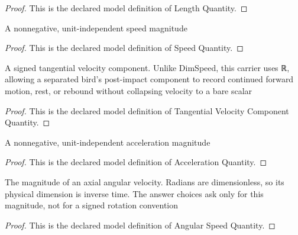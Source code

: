 \begin{proof}
  This is the declared model definition of Length Quantity.
\end{proof}
\begin{definition}
  \label{def:physics:phyx-mini-0790:phyxminiproblems-problemphyxmini0790-speedquantity}
  A nonnegative, unit-independent speed magnitude
\end{definition}
\begin{proof}
  This is the declared model definition of Speed Quantity.
\end{proof}
\begin{definition}
  \label{def:physics:phyx-mini-0790:phyxminiproblems-problemphyxmini0790-tangentialvelocitycomponentquantity}
  A signed tangential velocity component. Unlike DimSpeed, this carrier uses ℝ, allowing a separated bird's post-impact component to record continued forward motion, rest, or rebound without collapsing velocity to a bare scalar
\end{definition}
\begin{proof}
  This is the declared model definition of Tangential Velocity Component Quantity.
\end{proof}
\begin{definition}
  \label{def:physics:phyx-mini-0790:phyxminiproblems-problemphyxmini0790-accelerationquantity}
  A nonnegative, unit-independent acceleration magnitude
\end{definition}
\begin{proof}
  This is the declared model definition of Acceleration Quantity.
\end{proof}
\begin{definition}
  \label{def:physics:phyx-mini-0790:phyxminiproblems-problemphyxmini0790-angularspeedquantity}
  The magnitude of an axial angular velocity. Radians are dimensionless, so its physical dimension is inverse time. The answer choices ask only for this magnitude, not for a signed rotation convention
\end{definition}
\begin{proof}
  This is the declared model definition of Angular Speed Quantity.
\end{proof}

